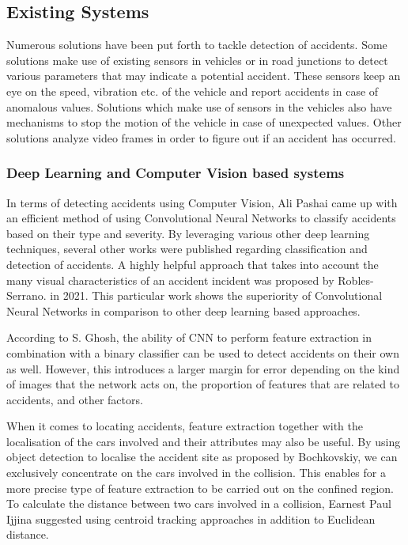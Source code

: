 \documentclass[ 12pt,a4paper,twocolumn,fleqn]{article}
\begin{document}
\begin{adjustwidth}{3.5em}{0pt}
\hspace{0.2cm}


\subsection{Existing Systems}

Numerous solutions have been put forth to tackle detection of accidents. Some solutions make use of existing sensors in vehicles or in road junctions to detect various parameters that may indicate a potential accident. These sensors keep an eye on the speed, vibration etc. of the vehicle and report accidents in case of anomalous values. Solutions which make use of sensors in the vehicles also have mechanisms to stop the motion of the vehicle in case of unexpected values. Other solutions analyze video frames in order to figure out if an accident has occurred.

\hspace{0.2cm}


\subsubsection{Deep Learning and Computer Vision based systems}
In terms of detecting accidents using Computer Vision, Ali Pashai came up with an efficient method of using Convolutional Neural Networks to classify accidents based on their type and severity. By leveraging various other deep learning techniques, several other works were published regarding classification and detection of accidents. A highly helpful approach that takes into account the many visual characteristics of an accident incident was proposed by Robles-Serrano. in 2021. This particular work shows the superiority of Convolutional Neural Networks in comparison to other deep learning based approaches.

\hspace{0.2cm}

According to S. Ghosh, the ability of CNN to perform feature extraction in combination with a binary classifier can be used to detect accidents on their own as well. However, this introduces a larger margin for error depending on the kind of images that the network acts on, the proportion of features that are related to accidents, and other factors.

\hspace{0.2cm}


When it comes to locating accidents, feature extraction together with the localisation of the cars involved and their attributes may also be useful. By using object detection to localise the accident site as proposed by Bochkovskiy, we can exclusively concentrate on the cars involved in the collision. This enables for a more precise type of feature extraction to be carried out on the confined region. To calculate the distance between two cars involved in a collision, Earnest Paul Ijjina suggested using centroid tracking approaches in addition to Euclidean distance.


\end{adjustwidth}
\end{document}

